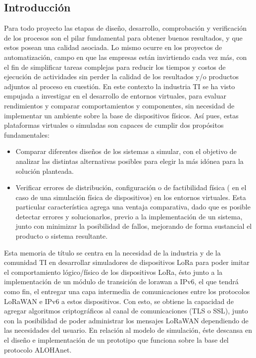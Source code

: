 \begin{justify}
\chapter{Introducción}
%
Para todo proyecto las etapas de diseño, desarrollo, comprobación y verificación de los procesos son el pilar fundamental para obtener buenos resultados, y que estos posean una calidad asociada. Lo mismo ocurre en los proyectos de automatización, campo en que las empresas están invirtiendo cada vez más, con el fin de simplificar tareas complejas para reducir los tiempos y costos de ejecución de actividades sin perder la calidad de los resultados y/o productos adjuntos al proceso en cuestión. En este contexto la industria TI se ha visto empujada a investigar en el desarrollo de entornos virtuales, para evaluar rendimientos y comparar comportamientos y componentes, sin necesidad de implementar un ambiente sobre la base de dispositivos físicos. Así pues, estas plataformas virtuales o simuladas son capaces de cumplir dos propósitos fundamentales:\\
\begin{itemize}
\item Comparar diferentes diseños de los sistemas a simular, con el objetivo de analizar las distintas alternativas posibles para elegir la más idónea para la solución planteada.
\item Verificar errores de distribución, configuración o de factibilidad física ( en el caso de una simulación física de dispositivos) en los entornos virtuales. Esta particular característica agrega una ventaja comparativa, dado que es posible detectar errores y solucionarlos, previo a la implementación de un sistema, junto con minimizar la posibilidad de fallos, mejorando de forma sustancial el producto o sistema resultante.
\end{itemize}
Esta memoria de título se centra en la necesidad de la industria y de la comunidad TI en desarrollar simuladores de dispositivos LoRa para poder imitar el comportamiento lógico/físico de los dispositivos LoRa, ésto junto a la implementación de un módulo de transición de \gls{lorawan} a IPv6, el que tendrá como fin, el entregar una capa intermedia de comunicaciones entre los protocolos LoRaWAN e IPv6 a estos dispositivos. Con esto, se obtiene la capacidad de agregar algoritmos criptográficos al canal de comunicaciones (TLS o SSL), junto con la posibilidad de poder administrar los mensajes LoRaWAN dependiendo de las necesidades del usuario. En relación al modelo de simulación, éste descansa en el diseño e implementación de un prototipo que funciona sobre la base del protocolo ALOHAnet.


\end{justify}
